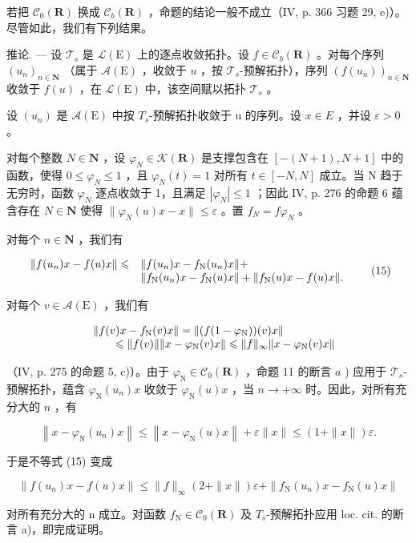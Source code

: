 若把 \(\mathcal{C}_{0}(\mathbf{R})\) 换成 \(\mathcal{C}_{b}(\mathbf{R})\) ，命题的结论一般不成立（IV, p. 366 习题 29, e)）。尽管如此，我们有下列结果。

推论. --- 设 \(\mathcal{T}_{s}\) 是 \(\mathcal{L}(\mathrm{E})\) 上的逐点收敛拓扑。设 \(f \in \mathcal{C}_{b}(\mathbf{R})\) 。对每个序列 \((u_{n})_{n \in \mathbf{N}}\) （属于 \(\mathcal{A}(\mathrm{E})\) ，收敛于 \(u\) ，按 \(\mathcal{T}_{s}\)-预解拓扑），序列 \((f(u_{n}))_{n \in \mathbf{N}}\) 收敛于 \(f(u)\) ，在 \(\mathcal{L}(\mathrm{E})\) 中，该空间赋以拓扑 \(\mathcal{T}_{s}\) 。

设 \((u_{n})\) 是 \(\mathcal{A}(\mathrm{E})\) 中按 \(T_{s}\)-预解拓扑收敛于 u 的序列。设 \(x \in E\) ，并设 \(\varepsilon > 0\) 。

对每个整数 \(N \in \mathbf{N}\) ，设 \(\varphi_{N} \in \mathcal{K}(\mathbf{R})\) 是支撑包含在 \([-(N+1), N+1]\) 中的函数，使得 \(0 \leqslant \varphi_{N} \leqslant 1\) ，且 \(\varphi_{N}(t) = 1\) 对所有 \(t \in [-N, N]\) 成立。当 N 趋于无穷时，函数 \(\varphi_{N}\) 逐点收敛于 1，且满足 \(|\varphi_{N}| \leqslant 1\) ；因此 IV, p. 276 的命题 6 蕴含存在 \(N \in \mathbf{N}\) 使得 \(\|\varphi_{N}(u)x - x\| \leqslant \varepsilon\) 。置 \(f_{N} = f\varphi_{N}\) 。

对每个 \(n\in \mathbf{N}\) ，我们有

\[
\begin{array}{r l} \| f (u _ {n}) x - f (u) x \| \leqslant & \| f (u _ {n}) x - f _ {\mathrm{N}} (u _ {n}) x \| + \\ & \| f _ {\mathrm{N}} (u _ {n}) x - f _ {\mathrm{N}} (u) x \| + \| f _ {\mathrm{N}} (u) x - f (u) x \|. \end{array} \tag {15}
\]

对每个 \(v\in \mathcal{A}(\mathrm{E})\) ，我们有

\[
\begin{array}{r l} & {\| f (v) x - f _ {\mathrm{N}} (v) x \| = \| (f (1 - \varphi_ {\mathrm{N}})) (v) x \|} \\ & {\qquad \leqslant \| f (v) \|   \| x - \varphi_ {\mathrm{N}} (v) x \| \leqslant \| f \| _ {\infty}   \| x - \varphi_ {\mathrm{N}} (v) x \|} \end{array}
\]

（IV, p. 275 的命题 5, c)）。由于 \(\varphi_{\mathrm{N}} \in \mathcal{C}_0(\mathbf{R})\) ，命题 11 的断言 \(a\) ) 应用于 \(\mathcal{T}_s\)-预解拓扑，蕴含 \(\varphi_{\mathrm{N}}(u_n)x\) 收敛于 \(\varphi_{\mathrm{N}}(u)x\) ，当 \(n \to +\infty\) 时。因此，对所有充分大的 \(n\) ，有

\[
\left\| x - \varphi_ {\mathrm{N}} (u _ {n}) x \right\| \leqslant \left\| x - \varphi_ {\mathrm{N}} (u) x \right\| + \varepsilon \| x \| \leqslant (1 + \| x \|) \varepsilon .
\]

于是不等式 (15) 变成

\[
\| f (u _ {n}) x - f (u) x \| \leqslant \| f \| _ {\infty} (2 + \| x \|) \varepsilon + \| f _ {\mathrm{N}} (u _ {n}) x - f _ {\mathrm{N}} (u) x \|
\]

对所有充分大的 n 成立。对函数 \(f_{\mathrm{N}} \in \mathcal{C}_{0}(\mathbf{R})\) 及 \(T_{s}\)-预解拓扑应用 loc. cit. 的断言 a)，即完成证明。


